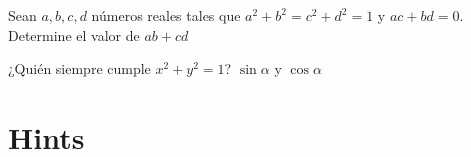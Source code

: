 \documentclass[11pt]{scrartcl}
\begin{document}
\vspace{0.1cm}
\begin{problem}
Sean $a,b,c,d$ números reales tales que $a^2+b^2=c^2+d^2=1$ y $ac+bd=0$. Determine el valor de $ab+cd$
  \begin{hint}
    ¿Quién siempre cumple $x^2+y^2=1$? \hspace{1cm}\tiny{$\sin\alpha$ y $\cos \alpha$}
  \end{hint}
\end{problem}
\vspace{0.1cm}

\newpage 
\bigskip

\section{Hints}
\begin{enumerate}
  
\end{enumerate}
\end{document}
